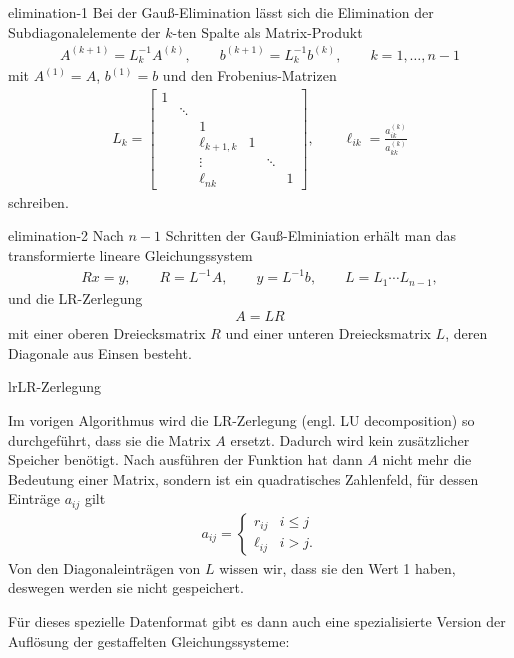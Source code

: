 \begin{Lemma}{elimination-1}
  Bei der Gauß-Elimination lässt sich die Elimination der
  Subdiagonalelemente der $k$-ten Spalte als Matrix-Produkt
  \begin{gather}
    A^{(k+1)} = L^{-1}_k A^{(k)},
    \qquad b^{(k+1)} = L^{-1}_k b^{(k)},
    \qquad k=1,\dots,n-1
  \end{gather}
  mit $A^{(1)}=A$, $b^{(1)}=b$ und den Frobenius-Matrizen
  \begin{gather}
    L_k =\begin{bmatrix}
      1 & & & & & \\
      &\ddots & & & & \\
      &   & 1& & &\\
      &   & \ell_{k+1,k}&1 & &\\
      &   & \vdots& &\ddots &\\
      &   & \ell_{nk}& & &1
    \end{bmatrix},
    \qquad
    \ell_{ik} = \frac{a_{ik}^{(k)}}{a_{kk}^{(k)}}
  \end{gather}
  schreiben.
\end{Lemma}

\begin{Satz}{elimination-2}
  Nach $n-1$ Schritten der Gauß-Elminiation erhält man das transformierte lineare Gleichungssystem
  \begin{gather}
    R x = y,\qquad R = L^{-1}A, \qquad y=L^{-1}b,
    \qquad L = L_1\cdots L_{n-1},
  \end{gather}
  und die LR-Zerlegung
  \begin{gather}
    A = LR
  \end{gather}
  mit einer oberen Dreiecksmatrix $R$ und einer unteren Dreiecksmatrix
  $L$, deren Diagonale aus Einsen besteht.
\end{Satz}

\begin{Algorithmus*}{lr}{LR-Zerlegung}
  
\end{Algorithmus*}

\begin{remark}
  Im vorigen Algorithmus wird die LR-Zerlegung (engl. LU
  decomposition) so durchgeführt, dass sie die Matrix $A$
  ersetzt. Dadurch wird kein zusätzlicher Speicher benötigt. Nach
  ausführen der Funktion hat dann $A$ nicht mehr die Bedeutung einer
  Matrix, sondern ist ein quadratisches Zahlenfeld, für dessen
  Einträge $a_{ij}$ gilt
  \begin{gather}
    a_{ij} =
    \begin{cases}
      r_{ij} & i \le j\\
      \ell_{ij} & i>j.
    \end{cases}
  \end{gather}
  Von den Diagonaleinträgen von $L$ wissen wir, dass sie den Wert 1
  haben, deswegen werden sie nicht gespeichert.

  Für dieses spezielle Datenformat gibt es dann auch eine
  spezialisierte Version der Auflösung der gestaffelten
  Gleichungssysteme:
\end{remark}

